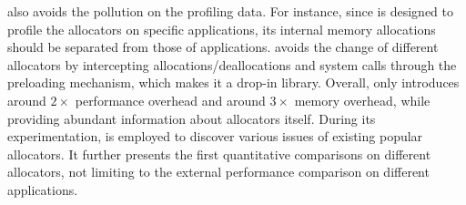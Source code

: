 \MP{} also avoids the pollution on the profiling data. For instance, since \MP{} is designed to profile the allocators on specific applications, its internal memory allocations should be separated from those  of applications. \MP{} avoids the change of different allocators by intercepting allocations/deallocations and system calls through the preloading mechanism, which makes it a drop-in library. Overall, \MP{} only introduces around $2\times$ performance overhead and around $3\times$ memory overhead, while providing abundant information about allocators itself. During its experimentation, \MP{} is employed to discover various issues of existing popular allocators. It further presents the first quantitative comparisons on different allocators, not limiting to the external performance comparison on different applications.  



\begin{comment}

1. Maybe we should detect the contention rate. If the last write is from a different thread, we will detect one contention. 
 
allocator: can we use some different configurations of the same allocator?
Can we use the same allocator on different applications, achieving different allocators?  
}





performance overhead: 
1. Using the hash maps to identify the size of each object is very slow. 
2. Turning multiple reads into one read around 2 or three times. 
3. Using the new mapping mechanism. 

How we can do that for glibc. We migrate the glibc as separate library, allowing us to intercept system or libraries. 

How to figure out the metadata information?
	
\end{comment}

 

